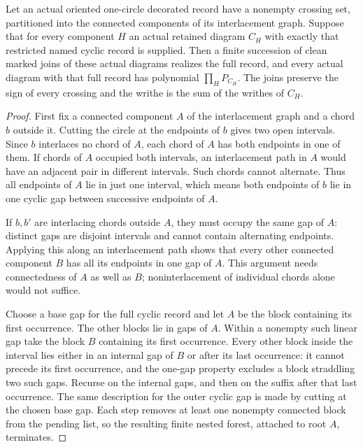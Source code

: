 \begin{lemma}\label{mp:blocks}\leanok
Let an actual oriented one-circle decorated record have a nonempty
crossing set, partitioned into the connected components of its
interlacement graph. Suppose that for every component $H$ an actual retained diagram
$C_H$ with exactly that restricted named cyclic record is supplied.
Then a finite succession of clean marked joins of these actual diagrams
realizes the full record, and every actual diagram with that full record
has polynomial $\prod_H P_{C_H}$. The joins preserve the sign of every
crossing and the writhe is the sum of the writhes of $C_H$.

\end{lemma}
\begin{proof}\leanok{}
First fix a connected component $A$ of the interlacement graph and a
chord $b$ outside it. Cutting the circle at the endpoints of $b$ gives
two open intervals. Since $b$ interlaces no chord of $A$, each chord
of $A$ has both endpoints in one of them. If chords of $A$ occupied
both intervals, an interlacement path in $A$ would have an adjacent
pair in different intervals. Such chords cannot alternate. Thus all
endpoints of $A$ lie in just one interval, which means both endpoints
of $b$ lie in one cyclic gap between successive endpoints of $A$.

If $b,b'$ are interlacing chords outside $A$, they must occupy the same
gap of $A$: distinct gaps are disjoint intervals and cannot contain
alternating endpoints. Applying this along an interlacement path shows
that every other connected component $B$ has all its endpoints in one
gap of $A$. This argument needs connectedness of $A$ as well as $B$;
noninterlacement of individual chords alone would not suffice.

Choose a base gap for the full cyclic record and let $A$ be the block
containing its first occurrence. The other blocks lie in gaps of $A$.
Within a nonempty such linear gap take the block $B$ containing its
first occurrence. Every other block inside the interval lies either in
an internal gap of $B$ or after its last occurrence: it cannot precede
its first occurrence, and the one-gap property excludes a block
straddling two such gaps. Recurse on the internal gaps, and then on
the suffix after that last occurrence. The same description for the
outer cyclic gap is made by cutting at the chosen base gap. Each step
removes at least one nonempty connected block from the pending list,
so the resulting finite nested forest, attached to root $A$, terminates.


\end{proof}
